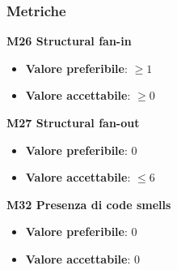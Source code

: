         \subsubsection{Metriche}
            \textbf{M26 Structural fan-in}
                \begin{itemize}
                    \item \textbf{Valore preferibile}: $ \ge 1$
                    \item \textbf{Valore accettabile}: $ \ge 0$
                \end{itemize}
            \textbf{M27 Structural fan-out}
                \begin{itemize}
                    \item \textbf{Valore preferibile}: $0$
                    \item \textbf{Valore accettabile}: $ \le 6$
                \end{itemize}
            \textbf{M32 Presenza di code smells}
            \begin{itemize}
            	\item \textbf{Valore preferibile}: $0$
            	\item \textbf{Valore accettabile}: $0$
            \end{itemize}
            
